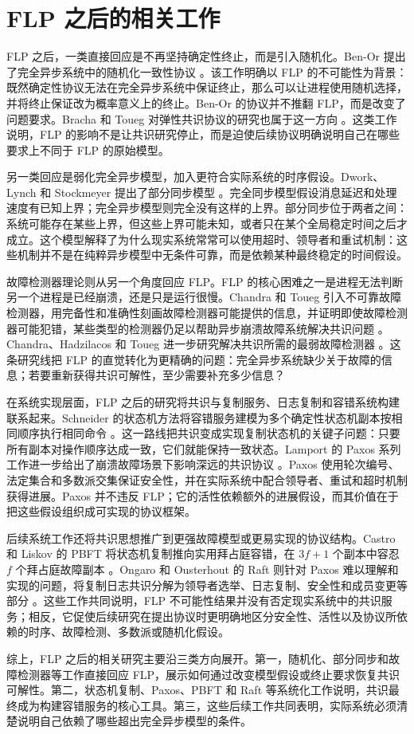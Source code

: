 \section{FLP 之后的相关工作}

FLP 之后，一类直接回应是不再坚持确定性终止，而是引入随机化。Ben-Or 提出了完全异步系统中的随机化一致性协议 \cite{benor1983advantage}。该工作明确以 FLP 的不可能性为背景：既然确定性协议无法在完全异步系统中保证终止，那么可以让进程使用随机选择，并将终止保证改为概率意义上的终止。Ben-Or 的协议并不推翻 FLP，而是改变了问题要求。Bracha 和 Toueg 对弹性共识协议的研究也属于这一方向 \cite{bracha1983resilient}。这类工作说明，FLP 的影响不是让共识研究停止，而是迫使后续协议明确说明自己在哪些要求上不同于 FLP 的原始模型。

另一类回应是弱化完全异步模型，加入更符合实际系统的时序假设。Dwork、Lynch 和 Stockmeyer 提出了部分同步模型 \cite{dwork1988consensus}。完全同步模型假设消息延迟和处理速度有已知上界；完全异步模型则完全没有这样的上界。部分同步位于两者之间：系统可能存在某些上界，但这些上界可能未知，或者只在某个全局稳定时间之后才成立。这个模型解释了为什么现实系统常常可以使用超时、领导者和重试机制：这些机制并不是在纯粹异步模型中无条件可靠，而是依赖某种最终稳定的时间假设。

故障检测器理论则从另一个角度回应 FLP。FLP 的核心困难之一是进程无法判断另一个进程是已经崩溃，还是只是运行很慢。Chandra 和 Toueg 引入不可靠故障检测器，用完备性和准确性刻画故障检测器可能提供的信息，并证明即使故障检测器可能犯错，某些类型的检测器仍足以帮助异步崩溃故障系统解决共识问题 \cite{chandra1996unreliable}。Chandra、Hadzilacos 和 Toueg 进一步研究解决共识所需的最弱故障检测器 \cite{chandra1996weakest}。这条研究线把 FLP 的直觉转化为更精确的问题：完全异步系统缺少关于故障的信息；若要重新获得共识可解性，至少需要补充多少信息？

在系统实现层面，FLP 之后的研究将共识与复制服务、日志复制和容错系统构建联系起来。Schneider 的状态机方法将容错服务建模为多个确定性状态机副本按相同顺序执行相同命令 \cite{schneider1990state}。这一路线把共识变成实现复制状态机的关键子问题：只要所有副本对操作顺序达成一致，它们就能保持一致状态。Lamport 的 Paxos 系列工作进一步给出了崩溃故障场景下影响深远的共识协议 \cite{lamport1998part,lamport2001paxos}。Paxos 使用轮次编号、法定集合和多数派交集保证安全性，并在实际系统中配合领导者、重试和超时机制获得进展。Paxos 并不违反 FLP；它的活性依赖额外的进展假设，而其价值在于把这些假设组织成可实现的协议框架。

后续系统工作还将共识思想推广到更强故障模型或更易实现的协议结构。Castro 和 Liskov 的 PBFT 将状态机复制推向实用拜占庭容错，在 $3f+1$ 个副本中容忍 $f$ 个拜占庭故障副本 \cite{castro1999practical}。Ongaro 和 Ousterhout 的 Raft 则针对 Paxos 难以理解和实现的问题，将复制日志共识分解为领导者选举、日志复制、安全性和成员变更等部分 \cite{ongaro2014search}。这些工作共同说明，FLP 不可能性结果并没有否定现实系统中的共识服务；相反，它促使后续研究在提出协议时更明确地区分安全性、活性以及协议所依赖的时序、故障检测、多数派或随机化假设。

综上，FLP 之后的相关研究主要沿三类方向展开。第一，随机化、部分同步和故障检测器等工作直接回应 FLP，展示如何通过改变模型假设或终止要求恢复共识可解性。第二，状态机复制、Paxos、PBFT 和 Raft 等系统化工作说明，共识最终成为构建容错服务的核心工具。第三，这些后续工作共同表明，实际系统必须清楚说明自己依赖了哪些超出完全异步模型的条件。
